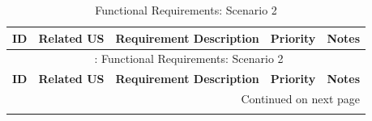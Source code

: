 \begin{longtable}{|p{1.5cm}|p{2.4cm}|p{6.7cm}|p{1.4cm}|p{2cm}|}
\caption{Functional Requirements: Scenario 2}
\label{tab:fr_scenario2} \\
\hline
\textbf{ID} & \textbf{Related US} & \textbf{Requirement Description} & \textbf{Priority} & \textbf{Notes} \\
\hline
\endfirsthead

\multicolumn{5}{c}{{\tablename\ \thetable{}: Functional Requirements: Scenario 2}} \\
\hline
\textbf{ID} & \textbf{Related US} & \textbf{Requirement Description} & \textbf{Priority} & \textbf{Notes} \\
\hline
\endhead

\hline \multicolumn{5}{|r|}{{Continued on next page}} \\ \hline
\endfoot

\hline
\endlastfoot


\end{longtable}
